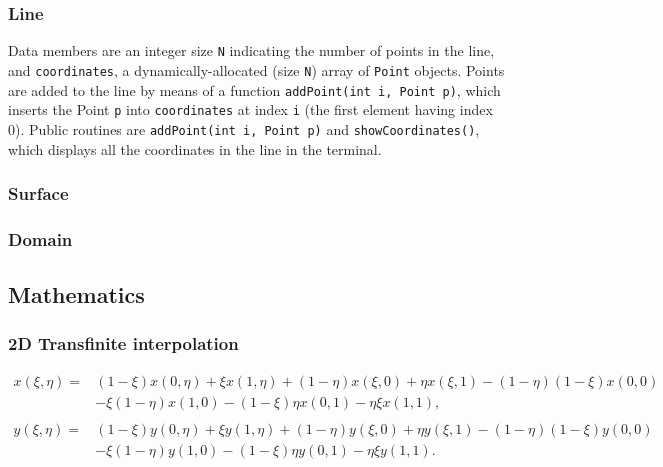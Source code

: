 \documentclass{article}
\newcommand{\ba}[1]{\begin{align*}    #1    \end{align*}}
\renewcommand{\t}[1]{\texttt{#1}}
\begin{document}
\subsubsection{Line}
Data members are an integer size \t{N} indicating the number of points in the line, and \t{coordinates}, a dynamically-allocated (size \t{N}) array of \t{Point} objects. Points are added to the line by means of a function \t{addPoint(int i, Point p)}, which inserts the Point \t{p} into \t{coordinates} at index \t{i} (the first element having index 0). Public routines are \t{addPoint(int i, Point p)} and \t{showCoordinates()}, which displays all the coordinates in the line in the terminal.

\subsubsection{Surface}

\subsubsection{Domain}

\subsection{Mathematics}

\subsubsection{2D Transfinite interpolation}
\ba{
x(\xi,\eta) = &(1-\xi)x(0,\eta)+\xi x(1,\eta)+(1-\eta)x(\xi,0)+\eta x(\xi,1)-(1-\eta)(1-\xi)x(0,0)
\\&-\xi(1-\eta)x(1,0)-(1-\xi)\eta x(0,1)-\eta \xi x(1,1),\\
\\y(\xi, \eta) = &(1-\xi)y(0,\eta)+\xi y(1,\eta)+(1-\eta)y(\xi,0)+\eta y(\xi,1)-(1-\eta)(1-\xi)y(0,0)
\\&-\xi(1-\eta)y(1,0)-(1-\xi)\eta y(0,1)-\eta \xi y(1,1).
}
\end{document}
